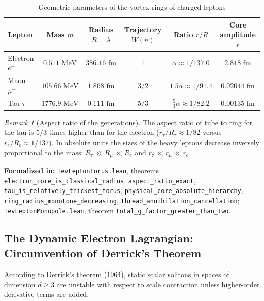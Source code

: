 \documentclass[11pt,a4paper]{article}
\providecommand{\lambdabar}{\bar{\lambda}}
\theoremstyle{definition}
\theoremstyle{remark}
\newtheorem{remark}{Remark}
\begin{document}
\begin{table}[htbp]
\centering
\small
\setlength{\tabcolsep}{6pt}
\caption{Geometric parameters of the vortex rings of charged leptons}
\label{tab:lepton_torus_dimensions}
\vspace{2mm}
\begin{tabular}{lccccc}
\toprule
Lepton & Mass $m$ & Radius $R = \lambdabar$ & Trajectory $W(n)$ & Ratio $r/R$ & Core amplitude $r$ \\
\midrule
Electron $e^-$ & $0.511\text{ MeV}$ & $386.16\text{ fm}$ & $1$ & $\alpha \approx 1/137.0$ & $2.818\text{ fm}$ \\
Muon $\mu^-$ & $105.66\text{ MeV}$ & $1.868\text{ fm}$ & $3/2$ & $1.5\alpha \approx 1/91.4$ & $0.02044\text{ fm}$ \\
Tau $\tau^-$ & $1776.9\text{ MeV}$ & $0.111\text{ fm}$ & $5/3$ & $\frac{5}{3}\alpha \approx 1/82.2$ & $0.00135\text{ fm}$ \\
\bottomrule
\end{tabular}
\end{table}
	
\begin{remark}[Aspect ratio of the generations]
The aspect ratio of tube to ring for the tau is $5/3$ times higher than for the electron ($r_\tau / R_\tau \approx 1/82$ versus $r_e / R_e \approx 1/137$). In absolute units the sizes of the heavy leptons decrease inversely proportional to the mass: $R_\tau \ll R_\mu \ll R_e$ and $r_\tau \ll r_\mu \ll r_e$.
\end{remark}

\noindent\small\textbf{Formalized in:} \texttt{TevLeptonTorus.lean}, theorems \texttt{electron_core_is_classical_radius}, \texttt{aspect_ratio_exact}, \texttt{tau_is_relatively_thickest_torus}, \texttt{physical_core_absolute_hierarchy}, \texttt{ring\_radius\_monotone\_decreasing}, \texttt{thread\_annihilation\_cancellation};\\ \texttt{TevLeptonMonopole.lean}, theorem \texttt{total_g_factor_greater_than_two}.

\subsection{The Dynamic Electron Lagrangian: Circumvention of Derrick's Theorem}
	
According to Derrick's theorem (1964), static scalar solitons in spaces of dimension $d \ge 3$ are unstable with respect to scale contraction unless higher-order derivative terms are added.
	
\end{document}
